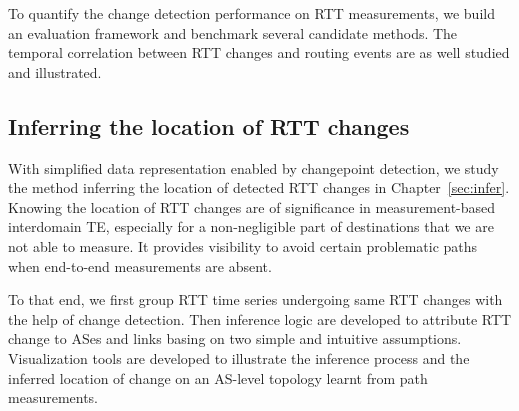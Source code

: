 To quantify the change detection performance on RTT measurements, we build an evaluation framework and benchmark several candidate methods.
The temporal correlation between RTT changes and routing events are as well studied and illustrated.

\subsection{Inferring the location of RTT changes}
With simplified data representation enabled by changepoint detection, we study the method inferring the location of detected RTT changes in Chapter~\ref{sec:infer}.
Knowing the location of RTT changes are of significance in measurement-based interdomain TE, especially for a non-negligible part of destinations that we are not able to measure. It provides visibility to avoid certain problematic paths when end-to-end measurements are absent.

To that end, we first group RTT time series undergoing same RTT changes with the help of change detection.
Then inference logic are developed to attribute RTT change to ASes and links basing on two simple and intuitive assumptions.
Visualization tools are developed to illustrate the inference process and the inferred location of change on an AS-level topology learnt from path measurements.
